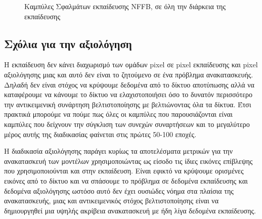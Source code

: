 \begin{figure}[H]
\begin{minipage}{0.5\linewidth}
      \end{minipage}
      \caption{Καμπύλες Σφαλμάτων εκπαίδευσης NFFB, σε όλη την διάρκεια της εκπαίδευσης}
    \end{figure}

\subsection{Σχόλια για την αξιολόγηση}
\par 
      Η εκπαίδευση δεν κάνει διαχωρισμό των ομάδων pixel σε pixel εκπαίδευσης και pixel αξιολόγησης μιας και αυτό δεν είναι το ζητούμενο σε ένα πρόβλημα ανακατασκευής. Δηλαδή δεν είναι στόχος να κρύψουμε δεδομένα από το δίκτυο αποτύπωσης αλλά να καταφέρουμε να κάνουμε το δίκτυο να ελαχιστοποιήσει όσο το δυνατόν περισσότερο την αντικειμενική συνάρτηση βελτιστοποίησης με βελτιώνοντας όλα τα δίκτυα. Έτσι πρακτικά μπορούμε να πούμε πως όλες οι καμπύλες που παρουσιάζονται είναι καμπύλες που δείχνουν την σύγκλιση των συνεχών συναρτήσεων και το μεγαλύτερο μέρος αυτής της διαδικασίας φαίνεται στις πρώτες 50-100 εποχές.

     Η διαδικασία αξιολόγησης παράγει κυρίως τα αποτελέσματα μετρικών για την ανακατασκευή των μοντέλων χρησιμοποιώντας ως είσοδο τις ίδιες εικόνες επίβλεψης που χρησιμοποιούνται και στην εκπαίδευση. Είναι εφικτό να κρύψουμε ορισμένες εικόνες από το δίκτυο και να σπάσουμε το πρόβλημα σε δεδομένα εκπαίδευσης και δεδομένα αξιολόγησης ωστόσο αυτό δεν έχει ουσιώδες νόημα στα πλαίσια της ανακατασκευής, μιας και αντικειμενικός στόχος βελτιστοποίησης είναι να δημιουργηθεί μια υψηλής ακρίβεια ανακατασκευή με ήδη λίγα δεδομένα εκπαίδευσης.
    \nobreak